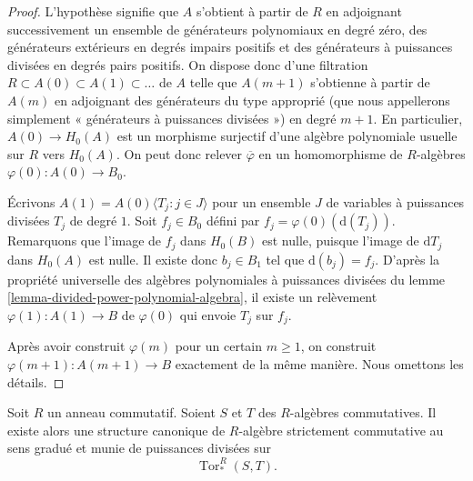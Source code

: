 \begin{proof}
L'hypothèse signifie que $A$ s'obtient à partir de $R$ en adjoignant
successivement un ensemble de générateurs polynomiaux en degré zéro, des
générateurs extérieurs en degrés impairs positifs et des générateurs à
puissances divisées en degrés pairs positifs. On dispose donc d'une filtration
$R \subset A(0) \subset A(1) \subset \ldots$
de $A$ telle que $A(m + 1)$ s'obtienne à partir de $A(m)$ en adjoignant des
générateurs du type approprié (que nous appellerons simplement
« générateurs à puissances divisées ») en degré $m + 1$. En particulier,
$A(0) \to H_0(A)$ est un morphisme surjectif d'une algèbre polynomiale
usuelle sur $R$ vers $H_0(A)$. On peut donc relever $\overline{\varphi}$ en un
homomorphisme de $R$-algèbres $\varphi(0) : A(0) \to B_0$.

\medskip\noindent
Écrivons $A(1) = A(0)\langle T_j:j\in J\rangle$ pour un ensemble $J$ de
variables à puissances divisées $T_j$ de degré $1$. Soit $f_j \in B_0$
défini par $f_j = \varphi(0)(\text{d}(T_j))$. Remarquons que l'image de $f_j$
dans $H_0(B)$ est nulle, puisque l'image de $\text{d}T_j$ dans $H_0(A)$ est
nulle. Il existe donc $b_j \in B_1$ tel que $\text{d}(b_j) = f_j$.
D'après la propriété universelle des algèbres polynomiales à puissances
divisées du lemme \ref{lemma-divided-power-polynomial-algebra}, il existe un
relèvement $\varphi(1) : A(1) \to B$ de $\varphi(0)$ qui envoie $T_j$ sur
$f_j$.

\medskip\noindent
Après avoir construit $\varphi(m)$ pour un certain $m \geq 1$, on construit
$\varphi(m + 1) : A(m + 1) \to B$ exactement de la même manière. Nous
omettons les détails.
\end{proof}

\begin{lemma}
\label{lemma-divided-powers-on-tor}
Soit $R$ un anneau commutatif. Soient $S$ et $T$ des $R$-algèbres
commutatives. Il existe alors une structure canonique de $R$-algèbre
strictement commutative au sens gradué et munie de puissances divisées sur
$$
\operatorname{Tor}_*^R(S, T).
$$
\end{lemma}

